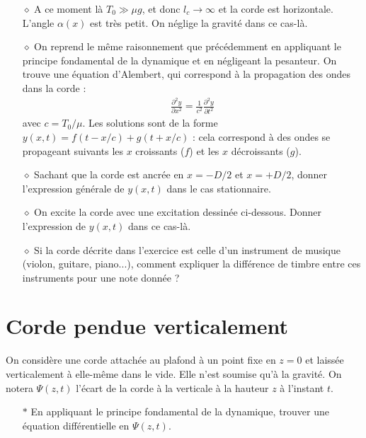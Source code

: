 \documentclass{report}
\begin{document}
\begin{itemize}

	\item[$\diamond$] A ce moment là $T_0\gg \mu g$, et donc $l_c\longrightarrow\infty$ et la corde est horizontale. L'angle $\alpha(x)$ est très petit. On néglige la gravité dans ce cas-là.

	\item[$\diamond$] On reprend le même raisonnement que précédemment en appliquant le principe fondamental de la dynamique et en négligeant la pesanteur. On trouve une équation d'Alembert, qui correspond à la propagation des ondes dans la corde :
	\begin{align*}
		\frac{\partial^2y}{\partial x^2}=\frac{1}{c^2}\frac{\partial^2y}{\partial t^2}
	\end{align*}
	avec $c=T_0/\mu$.
	Les solutions sont de la forme $y(x,t)=f(t-x/c)+g(t+x/c)$ : cela correspond à des ondes se propageant suivants les $x$ croissants ($f$) et les $x$ décroissants ($g$).
	\item[$\diamond$] Sachant que la corde est ancrée en $x=-D/2$ et $x=+D/2$, donner l'expression générale de $y(x,t)$ dans le cas stationnaire. 
	
	\item[$\diamond$] On excite la corde avec une excitation dessinée ci-dessous. Donner l'expression de $y(x,t)$ dans ce cas-là.
	
	\item[$\diamond$] Si la corde décrite dans l'exercice est celle d'un instrument de musique (violon, guitare, piano...), comment expliquer la différence de timbre entre ces instruments pour une note donnée ?
	
\end{itemize}

\newpage

\section*{Corde pendue verticalement}

On considère une corde attachée au plafond à un point fixe en $z=0$ et laissée verticalement à elle-même dans le vide. Elle n'est soumise qu'à la gravité. On notera $\Psi(z,t)$ l'écart de la corde à la verticale à la hauteur $z$ à l'instant $t$.

\begin{itemize}

	\item[$\ast$] En appliquant le principe fondamental de la dynamique, trouver une équation différentielle en  $\Psi(z,t)$.

\end{itemize}
\end{document}
